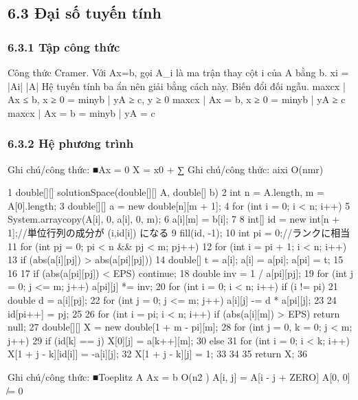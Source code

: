 \documentclass[11pt]{article}
\begin{document}
\subsection{6.3 Đại số tuyến tính}
\subsubsection{6.3.1 Tập công thức}
\begin{NoteBlock}
Công thức Cramer.
Với Ax=b, gọi A_i là ma trận thay cột i của A bằng b.
xi =
|Ai|
|A|
Hệ tuyến tính ba ẩn nên giải bằng cách này.
Biến đổi đối ngẫu.
max{cx | Ax ≤ b, x ≥ 0} = min{yb | yA ≥ c, y ≥ 0}
max{cx | Ax = b, x ≥ 0} = min{yb | yA ≥ c}
max{cx | Ax = b} = min{yb | yA = c}
\end{NoteBlock}
\subsubsection{6.3.2 Hệ phương trình}
\begin{NoteBlock}
Ghi chú/công thức: ■Ax = 0   X = {x0 +
∑
Ghi chú/công thức: aixi}   O(nmr)
\end{NoteBlock}
\begin{Code}
1 double[][] solutionSpace(double[][] A, double[] b) {
2 int n = A.length, m = A[0].length;
3 double[][] a = new double[n][m + 1];
4 for (int i = 0; i < n; i++) {
5 System.arraycopy(A[i], 0, a[i], 0, m);
6 a[i][m] = b[i];
7 }
8 int[] id = new int[n + 1];//単位行列の成分が (i,id[i]) になる
9 fill(id, -1);
10 int pi = 0;//ランクに相当
11 for (int pj = 0; pi < n && pj < m; pj++) {
12 for (int i = pi + 1; i < n; i++) {
13 if (abs(a[i][pj]) > abs(a[pi][pj])) {
14 double[] t = a[i]; a[i] = a[pi]; a[pi] = t;
15 }
16 }
17 if (abs(a[pi][pj]) < EPS) continue;
18 double inv = 1 / a[pi][pj];
19 for (int j = 0; j <= m; j++) a[pi][j] *= inv;
20 for (int i = 0; i < n; i++) if (i != pi) {
21 double d = a[i][pj];
22 for (int j = 0; j <= m; j++) a[i][j] -= d * a[pi][j];
23 }
24 id[pi++] = pj;
25 }
26 for (int i = pi; i < n; i++) if (abs(a[i][m]) > EPS) return null;
27 double[][] X = new double[1 + m - pi][m];
28 for (int j = 0, k = 0; j < m; j++) {
29 if (id[k] == j) X[0][j] = a[k++][m];
30 else {
31 for (int i = 0; i < k; i++) X[1 + j - k][id[i]] = -a[i][j];
32 X[1 + j - k][j] = 1;
33 }
34 }
35 return X;
36 }
\end{Code}
\begin{NoteBlock}
Ghi chú/công thức: ■Toeplitz   A  Ax = b   O(n2
)
A[i, j] = A[i - j + ZERO]
A[0, 0] ̸= 0
\end{NoteBlock}
\end{document}
